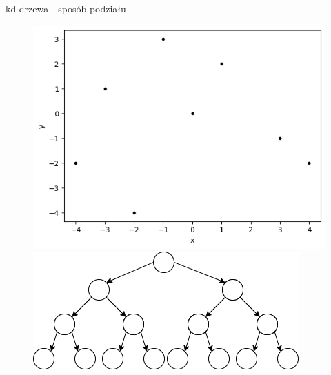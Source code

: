 \documentclass[aspectratio=169,dvipsnames]{beamer}
\begin{document}
\begin{frame}{kd-drzewa - sposób podziału}
    \begin{figure}[H]
        \centering
          \begin{minipage}{0.5\textwidth}
            \centering
            \includegraphics[width=\linewidth]{images/plots/1.png}
          \end{minipage}%
          \begin{minipage}{0.5\textwidth}
            \centering
            \includegraphics[width=\linewidth]{images/trees/1.drawio.png}
          \end{minipage}
    \end{figure}
\end{frame}
\end{document}
